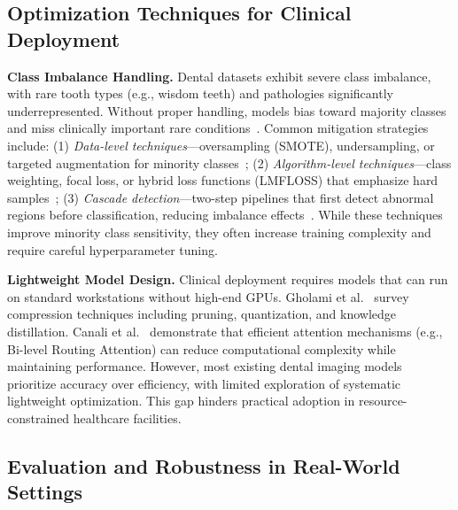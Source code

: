 \subsection{Optimization Techniques for Clinical Deployment}
\label{subsec:optimization}

\textbf{Class Imbalance Handling.} Dental datasets exhibit severe class imbalance, with rare tooth types (e.g., wisdom teeth) and pathologies significantly underrepresented. Without proper handling, models bias toward majority classes and miss clinically important rare conditions~\cite{hamamci2023dentex,sharma2024oralhealth}. Common mitigation strategies include: (1) \textit{Data-level techniques}---oversampling (SMOTE), undersampling, or targeted augmentation for minority classes~\cite{hassanein2024utilizing}; (2) \textit{Algorithm-level techniques}---class weighting, focal loss, or hybrid loss functions (LMFLOSS) that emphasize hard samples~\cite{li2022imbalanced}; (3) \textit{Cascade detection}---two-step pipelines that first detect abnormal regions before classification, reducing imbalance effects~\cite{jiang2021imbalanced,araujo2025twostep}. While these techniques improve minority class sensitivity, they often increase training complexity and require careful hyperparameter tuning.

\textbf{Lightweight Model Design.} Clinical deployment requires models that can run on standard workstations without high-end GPUs. Gholami et al.~\cite{gholami2025efficient} survey compression techniques including pruning, quantization, and knowledge distillation. Canali et al.~\cite{canali2022challenges} demonstrate that efficient attention mechanisms (e.g., Bi-level Routing Attention) can reduce computational complexity while maintaining performance. However, most existing dental imaging models prioritize accuracy over efficiency, with limited exploration of systematic lightweight optimization. This gap hinders practical adoption in resource-constrained healthcare facilities.

\subsection{Evaluation and Robustness in Real-World Settings}
\label{subsec:evaluation}

